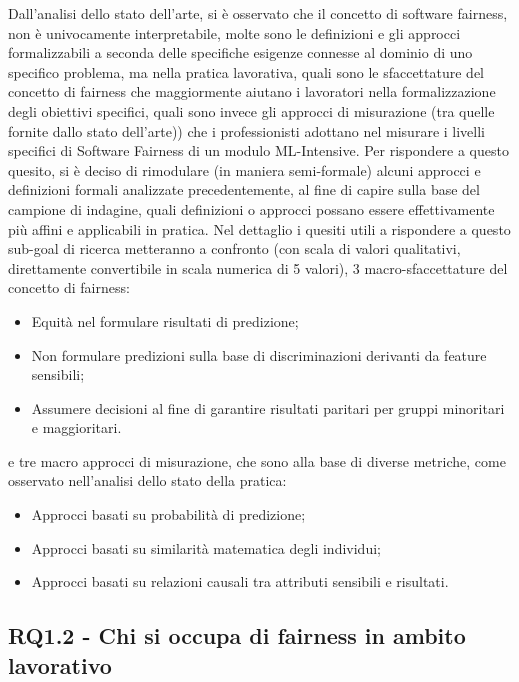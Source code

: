 	Dall'analisi dello stato dell'arte, si è osservato che il concetto di software fairness, non è univocamente interpretabile, molte sono le definizioni e gli approcci formalizzabili a seconda delle specifiche esigenze connesse al dominio di uno specifico problema, ma nella pratica lavorativa, quali sono le sfaccettature del concetto di fairness che maggiormente aiutano i lavoratori nella formalizzazione degli obiettivi specifici, quali sono invece gli approcci di misurazione (tra quelle fornite dallo stato dell'arte)) che i professionisti adottano nel misurare i livelli specifici di Software Fairness di un modulo ML-Intensive. Per rispondere a questo quesito, si è deciso di rimodulare (in maniera semi-formale) alcuni approcci e definizioni formali analizzate precedentemente, al fine di capire sulla base del campione di indagine, quali definizioni o approcci possano essere effettivamente più affini e applicabili in pratica. Nel dettaglio i quesiti utili a rispondere a questo sub-goal di ricerca metteranno a confronto (con scala di valori qualitativi, direttamente convertibile in scala numerica di 5 valori), 3 macro-sfaccettature del concetto di fairness:
	
	\begin{itemize}
		\item Equità nel formulare risultati di predizione;
		\item Non formulare predizioni sulla base di discriminazioni derivanti da feature sensibili;
		\item Assumere decisioni al fine di garantire risultati paritari per gruppi minoritari e maggioritari.
	\end{itemize}

	e tre macro approcci di misurazione, che sono alla base di diverse metriche, come osservato nell'analisi dello stato della pratica:
	
	\begin{itemize}
		\item Approcci basati su probabilità di predizione;
		\item Approcci basati su similarità matematica degli individui;
		\item Approcci basati su relazioni causali tra attributi sensibili e risultati.
	\end{itemize}
	\newpage
	
	\subsection{RQ1.2 - Chi si occupa di fairness in ambito lavorativo}
	\begin{center}
		\hspace*{-5mm}%
	\end{center}
	
